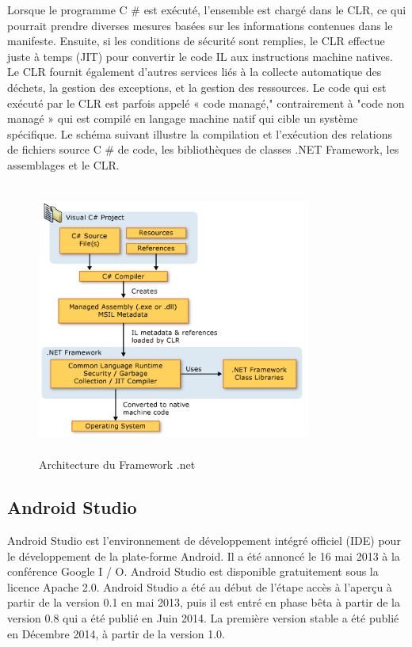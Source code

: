 \documentclass[11pt, a4paper, twoside]{book}
\begin{document}
Lorsque le programme C \# est exécuté, l'ensemble est chargé dans le CLR, ce qui pourrait prendre diverses mesures basées sur les informations contenues dans le manifeste. Ensuite, si les conditions de sécurité sont remplies, le CLR effectue juste à temps (JIT) pour convertir le code IL aux instructions machine natives. Le CLR fournit également d'autres services liés à la collecte automatique des déchets, la gestion des exceptions, et la gestion des ressources. Le code qui est exécuté par le CLR est parfois appelé « code managé," contrairement à "code non managé » qui est compilé en langage machine natif qui cible un système spécifique. Le schéma suivant illustre la compilation et l'exécution des relations de fichiers source C \# de code, les bibliothèques de classes .NET Framework, les assemblages et le CLR.
\begin{figure}[H]
\centering
\includegraphics[width=9cm,height=9cm]{net}
\caption{Architecture du Framework .net}
\end{figure}
\subsection{Android Studio}
Android Studio est l'environnement de développement intégré officiel (IDE) pour le développement de la plate-forme Android. Il a été annoncé le 16 mai 2013 à la conférence Google I / O. Android Studio est disponible gratuitement sous la licence Apache 2.0. Android Studio a été au début de l'étape accès à l'aperçu à partir de la version 0.1 en mai 2013, puis il est entré en phase bêta à partir de la version 0.8 qui a été publié en Juin 2014. La première version stable a été publié en Décembre 2014, à partir de la version 1.0.\\
\end{document}
